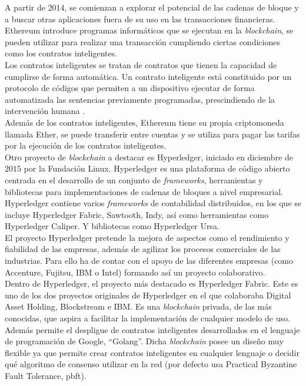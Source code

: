 A partir de 2014, se comienzan a explorar el potencial de las cadenas de bloque y a buscar otras aplicaciones fuera de su uso en las transacciones financieras.\\

Ethereum introduce programas informáticos que se ejecutan en la \textit{blockchain}, se pueden utilizar para realizar una transacción cumpliendo ciertas condiciones como los contratos inteligentes.\\

Los contratos inteligentes se tratan de contratos que tienen la capacidad de cumplirse de forma automática. Un contrato inteligente está constituido por un protocolo de códigos que permiten a un dispositivo ejecutar de forma automatizada las sentencias previamente programadas, prescindiendo de la intervención humana \cite{contrato-inteligente}.\\

\newpage
Además de los contratos inteligentes, Ethereum tiene su propia criptomoneda llamada Ether, se puede transferir entre cuentas y se utiliza para pagar las tarifas por la ejecución de los contratos inteligentes.\\

Otro proyecto de \textit{blockchain} a destacar es Hyperledger\cite{hyperledger-org}, iniciado en diciembre de $2015$ por la Fundación Linux. Hyperledger es una plataforma de código abierto centrada en el desarrollo de un conjunto de \textit{frameworks}, herramientas y bibliotecas para implementaciones de cadenas de bloques a nivel empresarial.\\

Hyperledger contiene varios \textit{frameworks} de contabilidad distribuidos, en los que se incluye Hyperledger Fabric, Sawtooth, Indy, así como herramientas como Hyperledger Caliper. Y bibliotecas como Hyperledger Ursa.\\

El proyecto Hyperledger pretende la mejora de aspectos como el rendimiento y fiabilidad de las empresas, además de agilizar los procesos comerciales de las industrias. Para ello ha de contar con el apoyo de las diferentes empresas (como Accenture, Fujitsu, IBM o Intel) formando así un proyecto colaborativo\cite{hyperledger-colab}.\\

Dentro de Hyperledger, el proyecto más destacado es Hyperledger Fabric. Este es uno de los dos proyectos originales de Hyperledger en el que colaboraba Digital Asset Holding, Blockstream e IBM. Es una \textit{blockchain} privada, de las más conocidas, que aspira a facilitar la implementación de cualquier modelo de uso. Además permite el despligue de contratos inteligentes desarrollados en el lenguaje de programación de Google, ``Golang''. Dicha \textit{blockchain} posee un diseño muy flexible ya que permite crear contratos inteligentes en cualquier lenguaje o decidir qué algoritmo de consenso utilizar en la red (por defecto usa Practical Byzantine Fault Tolerance, \acrshort{pbft})\cite{hyperledger-fabric}.\\

